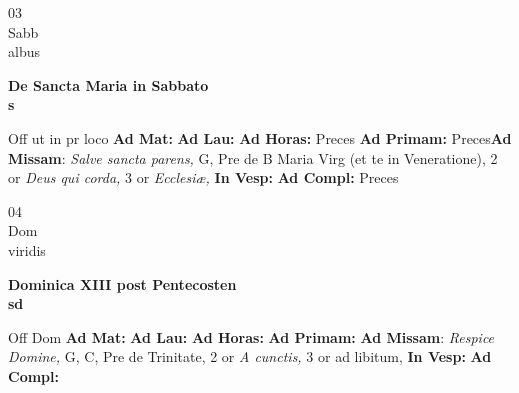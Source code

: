 \documentclass[10pt, openany]{book}
\begin{document}
    \begin{center}
        \begin{minipage}{3.5in}
            \vspace{2em}
            \begin{minipage}{0.5in}
                {\Huge 03} \\
                {\normalsize Sabb} \\
                {\normalsize albus}
            \end{minipage}
            \begin{minipage}{3.0in}
                \textbf{ \large De Sancta Maria in Sabbato \\
                \textnormal{\normalsize s}} \\ 
            \end{minipage}
            \begin{justify}Off ut in pr loco
                \textbf{Ad Mat: }
                \textbf{Ad Lau: }
                \textbf{Ad Horas: }Preces
                \textbf{Ad Primam: }Preces\textbf{Ad Missam}: \textit{Salve sancta parens,} G, Pre de B Maria Virg (et te in Veneratione), 2 or \textit{Deus qui corda,} 3 or \textit{Ecclesiæ,}  
                \textbf{In Vesp: }
                \textbf{Ad Compl: }Preces
            \end{justify}
        \end{minipage}
    \end{center}

    \begin{center}
        \begin{minipage}{3.5in}
            \vspace{2em}
            \begin{minipage}{0.5in}
                {\Huge 04} \\
                {\normalsize Dom} \\
                {\normalsize viridis}
            \end{minipage}
            \begin{minipage}{3.0in}
                \textbf{ \large Dominica XIII post Pentecosten \\
                \textnormal{\normalsize sd}} \\ 
            \end{minipage}
            \begin{justify}Off Dom
                \textbf{Ad Mat: }
                \textbf{Ad Lau: }
                \textbf{Ad Horas: }
                \textbf{Ad Primam: }\textbf{Ad Missam}: \textit{Respice Domine,} G, C, Pre de Trinitate, 2 or \textit{A cunctis,} 3 or ad libitum,  
                \textbf{In Vesp: }
                \textbf{Ad Compl: }
            \end{justify}
        \end{minipage}
    \end{center}
\end{document}
